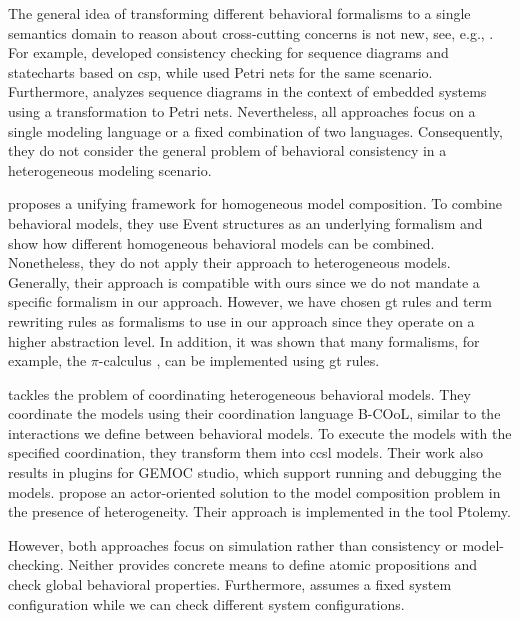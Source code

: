 \documentclass{jot}
\begin{document}
The general idea of transforming different behavioral formalisms to a single semantics domain to reason about cross-cutting concerns is not new, see, e.g., \cite{engelsMethodologySpecifyingAnalyzing2001}.
For example, \cite{kusterExplicitBehavioralConsistency2003} developed consistency checking for sequence diagrams and statecharts based on \gls*{csp}, while \cite{yaoConsistencyCheckingUML2006} used Petri nets for the same scenario.
Furthermore, \cite{cunhaFormalVerificationUML2011} analyzes sequence diagrams in the context of embedded systems using a transformation to Petri nets.
Nevertheless, all approaches focus on a single modeling language or a fixed combination of two languages.
Consequently, they do not consider the general problem of behavioral consistency in a heterogeneous modeling scenario.

\cite{kienzleUnifyingFrameworkHomogeneous2019} proposes a unifying framework for homogeneous model composition.
To combine behavioral models, they use Event structures as an underlying formalism and show how different homogeneous behavioral models can be combined.
Nonetheless, they do not apply their approach to heterogeneous models.
Generally, their approach is compatible with ours since we do not mandate a specific formalism in our approach.
However, we have chosen \gls*{gt} rules and term rewriting rules as formalisms to use in our approach since they operate on a higher abstraction level.
In addition, it was shown that many formalisms, for example, the $\pi$-calculus \cite{gadducciGraphRewritingPcalculus2007}, can be implemented using \gls*{gt} rules.

\cite{varalarsenBehavioralCoordinationOperator2015} tackles the problem of coordinating heterogeneous behavioral models.
They coordinate the models using their coordination language B-COoL, similar to the interactions we define between behavioral models.
To execute the models with the specified coordination, they transform them into \gls*{ccsl} models.  
Their work also results in plugins for GEMOC studio, which support running and debugging the models.
\cite{ekerTamingHeterogeneityPtolemy2003} propose an actor-oriented solution to the model composition problem in the presence of heterogeneity.
Their approach is implemented in the tool Ptolemy.

However, both approaches focus on simulation rather than consistency or model-checking.
Neither provides concrete means to define atomic propositions and check global behavioral properties.
Furthermore, \cite{varalarsenBehavioralCoordinationOperator2015} assumes a fixed system configuration while we can check different system configurations.
\end{document}
